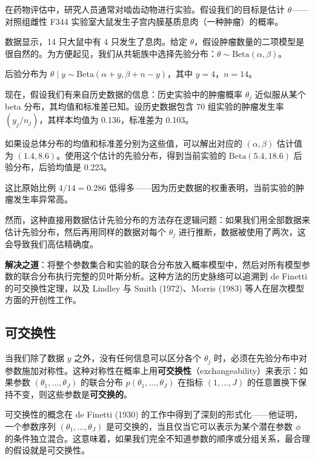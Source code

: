 \begin{Example}[估计一组大鼠的肿瘤风险]\label{ex:rat-tumor}
  在药物评估中，研究人员通常对啮齿动物进行实验。假设我们的目标是估计 $\theta$——对照组雌性 F344 实验室大鼠发生子宫内膜基质息肉（一种肿瘤）的概率。

  数据显示，14 只大鼠中有 4 只发生了息肉。给定 $\theta$，假设肿瘤数量的二项模型是很自然的。为方便起见，我们从共轭族中选择先验分布：$\theta \sim \mathrm{Beta}(\alpha, \beta)$。

  后验分布为 $\theta \mid y \sim \mathrm{Beta}(\alpha + y, \beta + n - y)$，其中 $y = 4$，$n = 14$。
\end{Example}

现在，假设我们有来自历史数据的信息：历史实验中的肿瘤概率 $\theta_j$ 近似服从某个 beta 分布，其均值和标准差已知。设历史数据包含 70 组实验的肿瘤发生率 $(y_j/n_j)$，其样本均值为 0.136，标准差为 0.103。

如果设总体分布的均值和标准差分别为这些值，可以解出对应的 $(\alpha, \beta)$ 估计值为 $(1.4, 8.6)$。使用这个估计的先验分布，得到当前实验的 $\mathrm{Beta}(5.4, 18.6)$ 后验分布，后验均值是 0.223。

这比原始比例 $4/14 = 0.286$ 低得多——因为历史数据的权重表明，当前实验的肿瘤发生率异常高。

然而，这种直接用数据估计先验分布的方法存在逻辑问题：如果我们用全部数据来估计先验分布，然后再用同样的数据对每个 $\theta_j$ 进行推断，数据被使用了两次，这会导致我们高估精确度。

\textbf{解决之道}：将整个参数集合和实验的联合分布放入概率模型中，然后对所有模型参数的联合分布执行完整的贝叶斯分析。这种方法的历史脉络可以追溯到 de Finetti 的可交换性定理，以及 Lindley 与 Smith (1972)、Morris (1983) 等人在层次模型方面的开创性工作。

\subsection{可交换性}

当我们除了数据 $y$ 之外，没有任何信息可以区分各个 $\theta_j$ 时，必须在先验分布中对参数施加对称性。这种对称性在概率上用\textbf{可交换性}（exchangeability）来表示：如果参数 $(\theta_1, \ldots, \theta_J)$ 的联合分布 $p(\theta_1, \ldots, \theta_J)$ 在指标 $(1, \ldots, J)$ 的任意置换下保持不变，则这些参数是\textbf{可交换的}。

可交换性的概念在 de Finetti (1930) 的工作中得到了深刻的形式化——他证明，一个参数序列 $(\theta_1, \ldots, \theta_J)$ 是可交换的，当且仅当它可以表示为某个潜在参数 $\phi$ 的条件独立混合。这意味着，如果我们完全不知道参数的顺序或分组关系，最合理的假设就是可交换性。

